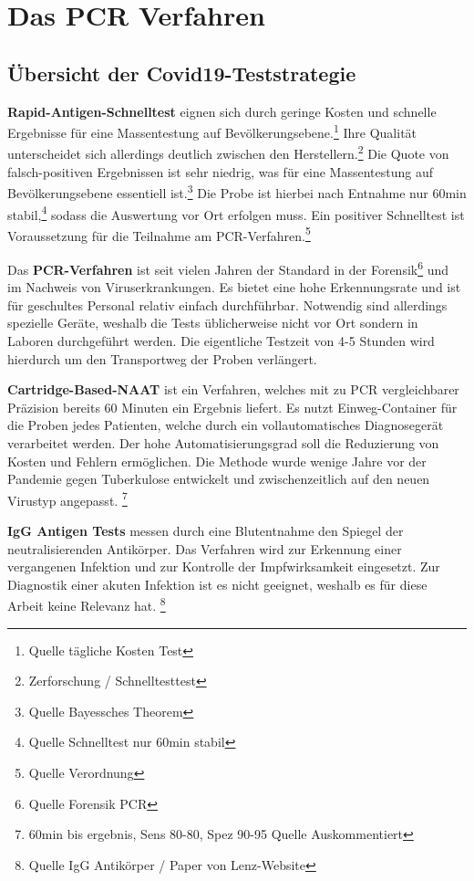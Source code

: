 \chapter{Das PCR Verfahren}
\section{Übersicht der Covid19-Teststrategie}
\textbf{Rapid-Antigen-Schnelltest} eignen sich durch geringe Kosten und schnelle Ergebnisse für eine Massentestung auf Bevölkerungsebene.\footnote{Quelle tägliche Kosten Test}
Ihre Qualität unterscheidet sich allerdings deutlich zwischen den Herstellern.\footnote{Zerforschung / Schnelltesttest}
Die Quote von falsch-positiven Ergebnissen ist sehr niedrig, was für eine Massentestung auf Bevölkerungsebene essentiell ist.\footnote{Quelle Bayessches Theorem}
Die Probe ist hierbei nach Entnahme nur 60min stabil,\footnote{Quelle Schnelltest nur 60min stabil}
sodass die Auswertung vor Ort erfolgen muss.
Ein positiver Schnelltest ist Voraussetzung für die Teilnahme am PCR-Verfahren.\footnote{Quelle Verordnung}

Das \textbf{PCR-Verfahren} ist seit vielen Jahren der Standard in der Forensik\footnote{Quelle Forensik PCR}
und im Nachweis von Viruserkrankungen. Es bietet eine hohe Erkennungsrate und ist für geschultes Personal relativ einfach durchführbar. Notwendig sind allerdings spezielle Geräte, weshalb die Tests üblicherweise nicht vor Ort sondern in Laboren durchgeführt werden. Die eigentliche Testzeit von 4-5 Stunden wird hierdurch um den Transportweg der Proben verlängert.

\textbf{Cartridge-Based-NAAT} ist ein Verfahren, welches mit zu PCR vergleichbarer Präzision bereits 60 Minuten ein Ergebnis liefert. Es nutzt Einweg-Container für die Proben jedes Patienten, welche durch ein vollautomatisches Diagnosegerät verarbeitet werden. Der hohe Automatisierungsgrad soll die Reduzierung von Kosten und Fehlern ermöglichen. Die Methode wurde wenige Jahre vor der Pandemie gegen Tuberkulose entwickelt und zwischenzeitlich auf den neuen Virustyp angepasst.
\footnote{60min bis ergebnis, Sens 80-80, Spez 90-95 Quelle Auskommentiert} %

\textbf{IgG Antigen Tests} messen durch eine Blutentnahme den Spiegel der neutralisierenden Antikörper.
Das Verfahren wird zur Erkennung einer vergangenen Infektion und zur Kontrolle der Impfwirksamkeit eingesetzt.
Zur Diagnostik einer akuten Infektion ist es nicht geeignet, weshalb es für diese Arbeit keine Relevanz hat.
\footnote{Quelle IgG Antikörper / Paper von Lenz-Website}

